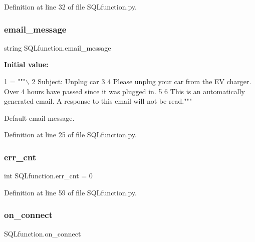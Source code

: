 Definition at line 32 of file S\+Q\+Lfunction.\+py.

\mbox{\label{namespace_s_q_lfunction_ae767f70baa76040d2b29bd6eeefd7bbe}} 
\subsubsection{\texorpdfstring{email\+\_\+message}{email\_message}}
{\footnotesize\ttfamily string S\+Q\+Lfunction.\+email\+\_\+message}

{\bfseries Initial value\+:}
\begin{DoxyCode}
1 =  \textcolor{stringliteral}{"""\(\backslash\)}
2 \textcolor{stringliteral}{Subject: Unplug car}
3 \textcolor{stringliteral}{}
4 \textcolor{stringliteral}{Please unplug your car from the EV charger. Over 4 hours have passed since it was plugged in.}
5 \textcolor{stringliteral}{}
6 \textcolor{stringliteral}{This is an automatically generated email. A response to this email will not be read."""}
\end{DoxyCode}


Default email message. 



Definition at line 25 of file S\+Q\+Lfunction.\+py.

\mbox{\label{namespace_s_q_lfunction_a5964aea00837148a0d731102edf6ac5c}} 
\subsubsection{\texorpdfstring{err\+\_\+cnt}{err\_cnt}}
{\footnotesize\ttfamily int S\+Q\+Lfunction.\+err\+\_\+cnt = 0}



Definition at line 59 of file S\+Q\+Lfunction.\+py.

\mbox{\label{namespace_s_q_lfunction_a215e7090f82fbf0d31fd97be6721389a}} 
\subsubsection{\texorpdfstring{on\+\_\+connect}{on\_connect}}
{\footnotesize\ttfamily S\+Q\+Lfunction.\+on\+\_\+connect}



